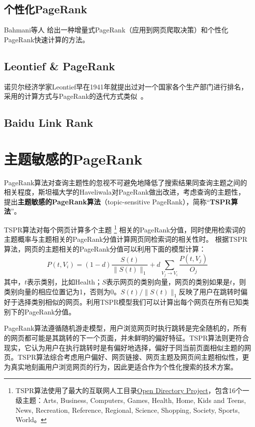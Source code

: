 \subsection{个性化PageRank}
Bahmani等人\cite{bahmani2010fast} 给出一种增量式PageRank（应用到网页爬取决策）和个性化PageRank快速计算的方法。

\subsection{Leontief \& PageRank}
诺贝尔经济学家Leontief早在1941年就提出过对一个国家各个生产部门进行排名，采用的计算方式与PageRank的迭代方式类似~\cite{franceschet2011pagerank}。

\subsection{Baidu Link Rank}%

\section{主题敏感的PageRank}
PageRank算法对查询主题性的忽视不可避免地降低了搜索结果同查询主题之间的相关程度，斯坦福大学的Haveliwala\cite{haveliwala2002topic}对PageRank做出改进，考虑查询的主题性，提出\textbf{主题敏感的PageRank算法}（topic-sensitive PageRank），简称“\textbf{TSPR算法}”。

TSPR算法对每个网页计算多个主题
\footnote{TSPR算法使用了最大的互联网人工目录\href{http://dmoz.org/}{Open Directory Project}，包含16个一级主题：Arts, Business, Computers, Games, Health, Home, Kids and Teens, News, Recreation, Reference, Regional, Science, Shopping, Society, Sports, World。}
相关的PageRank分值，同时使用检索词的主题概率与主题相关的PageRank分值计算网页同检索词的相关性时。
根据TSPR算法，网页的主题相关的PageRank分值可以利用下面的模型计算：
\begin{equation}\label{eq:tspr}
    P(t,V_i) = (1-d) \frac{S(t)}{\|S(t)\|_1} + d \sum_{V_j\rightarrow V_i}{\frac{P(t,V_j)}{O_j}}
\end{equation}
其中，$t$表示类别，比如Health；$S$表示网页的类别向量，网页的类别如果是$t$，则类别向量的相应位置记为1，否则为0。$S(t)/\|S(t)\|_1$反映了用户在跳转时偏好于选择类别相似的网页。利用TSPR模型我们可以计算出每个网页在所有已知类别下的PageRank分值。

PageRank算法遵循随机游走模型，用户浏览网页时执行跳转是完全随机的，所有的网页都可能是其跳转的下一个页面，并未鲜明的偏好特征。TSPR算法则更符合现实，它认为用户在执行跳转时是有偏好地选择，偏好于同当前页面相似主题的网页。TSPR算法综合考虑用户偏好、网页链接、网页主题及网页间主题相似性，更为真实地刻画用户浏览网页的行为，因此更适合作为个性化搜索的技术方案。

